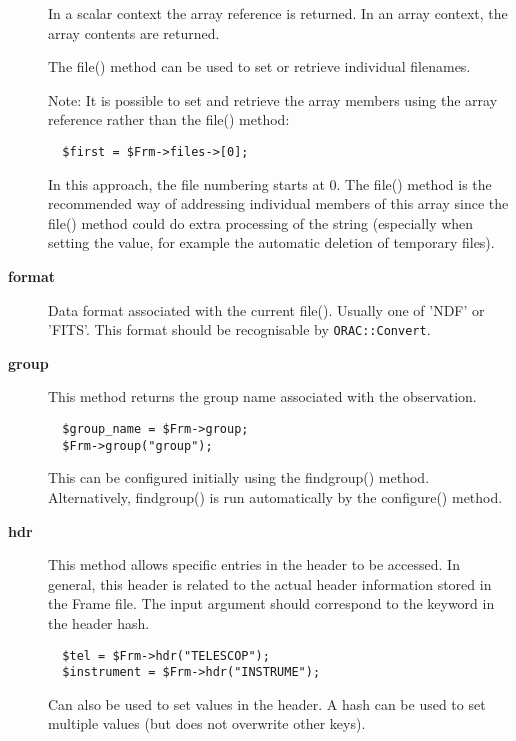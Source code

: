 \begin{description}
In a scalar context the array reference is returned.
In an array context, the array contents are returned.



The file() method can be used to set or retrieve individual
filenames.



Note: It is possible to set and retrieve the array members using
the array reference rather than the file() method:

\begin{verbatim}
  $first = $Frm->files->[0];
\end{verbatim}


In this approach, the file numbering starts at 0. The file() method
is the recommended way of addressing individual members of this
array since the file() method could do extra processing of the
string (especially when setting the value, for example the automatic
deletion of temporary files).

\item[\textbf{format}] \mbox{}

Data format associated with the current file().
Usually one of 'NDF' or 'FITS'. This format should be
recognisable by \texttt{ORAC::Convert}.

\item[\textbf{group}] \mbox{}

This method returns the group name associated with the observation.

\begin{verbatim}
  $group_name = $Frm->group;
  $Frm->group("group");
\end{verbatim}


This can be configured initially using the findgroup() method.
Alternatively, findgroup() is run automatically by the configure()
method.

\item[\textbf{hdr}] \mbox{}

This method allows specific entries in the header to be accessed.  In
general, this header is related to the actual header information
stored in the Frame file. The input argument should correspond to the
keyword in the header hash.

\begin{verbatim}
  $tel = $Frm->hdr("TELESCOP");
  $instrument = $Frm->hdr("INSTRUME");
\end{verbatim}


Can also be used to set values in the header.
A hash can be used to set multiple values (but does not overwrite
other keys).


\end{description}
